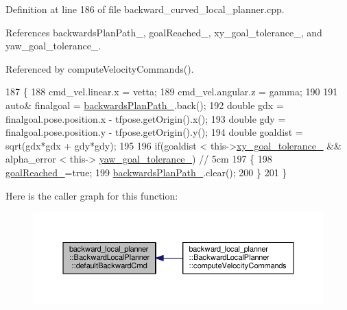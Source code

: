 Definition at line 186 of file backward\+\_\+curved\+\_\+local\+\_\+planner.\+cpp.



References backwards\+Plan\+Path\+\_\+, goal\+Reached\+\_\+, xy\+\_\+goal\+\_\+tolerance\+\_\+, and yaw\+\_\+goal\+\_\+tolerance\+\_\+.



Referenced by compute\+Velocity\+Commands().


\begin{DoxyCode}
187 \{
188     cmd\_vel.linear.x = vetta;
189     cmd\_vel.angular.z = gamma;
190 
191     \textcolor{keyword}{auto}& finalgoal = \hyperlink{classbackward__local__planner_1_1BackwardLocalPlanner_aaa37c16e1735cb440986b3d41e6ef8e6}{backwardsPlanPath\_}.back();
192     \textcolor{keywordtype}{double} gdx = finalgoal.pose.position.x - tfpose.getOrigin().x();
193     \textcolor{keywordtype}{double} gdy = finalgoal.pose.position.y - tfpose.getOrigin().y();
194     \textcolor{keywordtype}{double} goaldist = sqrt(gdx*gdx + gdy*gdy);
195 
196     \textcolor{keywordflow}{if}(goaldist < this->\hyperlink{classbackward__local__planner_1_1BackwardLocalPlanner_accf76d17d29c3b798fc4ec7841273b7c}{xy\_goal\_tolerance\_} && alpha\_error < this->
      \hyperlink{classbackward__local__planner_1_1BackwardLocalPlanner_ad402f445e3358e233e4cbcc31def86c7}{yaw\_goal\_tolerance\_}) \textcolor{comment}{// 5cm}
197     \{
198         \hyperlink{classbackward__local__planner_1_1BackwardLocalPlanner_a42fdfaf0d3eb1edb71a225ec7caf62d0}{goalReached\_}=\textcolor{keyword}{true};
199         \hyperlink{classbackward__local__planner_1_1BackwardLocalPlanner_aaa37c16e1735cb440986b3d41e6ef8e6}{backwardsPlanPath\_}.clear();
200     \}
201 \}
\end{DoxyCode}


Here is the caller graph for this function\+:
\nopagebreak
\begin{figure}[H]
\begin{center}
\leavevmode
\includegraphics[width=350pt]{classbackward__local__planner_1_1BackwardLocalPlanner_aeeb7c645f6965c3c400a948d74cdc7b1_icgraph}
\end{center}
\end{figure}


